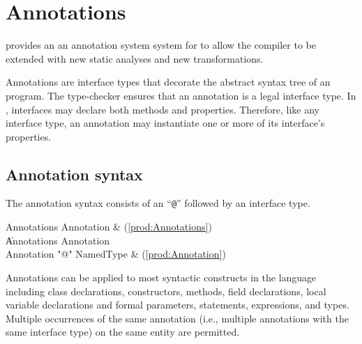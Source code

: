 \chapter{Annotations}\label{XtenAnnotations}


\Xten{} provides an 
an annotation system  system for to allow the
compiler to be extended with new static analyses and new
transformations.

Annotations are interface types that decorate the abstract syntax tree
of an \Xten{} program.  The \Xten{} type-checker ensures that an annotation
is a legal interface type.
In \Xten{}, interfaces may declare
both methods and properties.  Therefore, like any interface type, an
annotation may instantiate
one or more of its interface's properties.

\section{Annotation syntax}

The annotation syntax consists of an ``\texttt{@}'' followed by an interface type.

\begin{bbgrammar}
         Annotations \: Annotation & (\ref{prod:Annotations}) \\
                    \| Annotations Annotation \\
          Annotation \: \xcd"@" NamedType & (\ref{prod:Annotation}) \\
\end{bbgrammar}

Annotations can be applied to most syntactic constructs in the language
including class declarations, constructors, methods, field declarations,
local variable declarations and formal parameters, statements,
expressions, and types.
Multiple occurrences of the same annotation (i.e., multiple
annotations with the same interface type) on the same entity are permitted.

